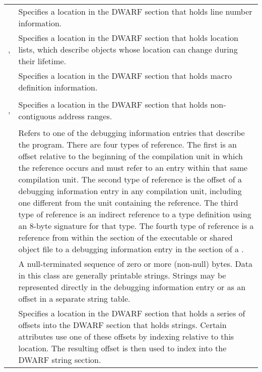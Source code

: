\begin{longtable}{l|P{11cm}}
\hypertarget{chap:classlineptr}{}
&Specifies a location in the DWARF section that holds line 
number information.
\\

\hypertarget{chap:classloclist}{}
, 
\hypertarget{chap:classloclistsptr}{}
&Specifies a location in the DWARF section that holds location 
lists, which describe objects whose location can change during 
their lifetime.
\\

\hypertarget{chap:classmacptr}{}
&Specifies 
a location in the DWARF section that holds macro definition
information.
\\

\hypertarget{chap:classrnglist}{}
, 
\hypertarget{chap:classrnglistsptr}{}
&Specifies a location in the DWARF section that holds 
non-contiguous address ranges.
\\

\hypertarget{chap:classreference}{}
&Refers to one of the debugging information
entries that \mbox{describe} the program.  There are four types of
\mbox{reference}. The first is an offset relative to the beginning
of the \mbox{compilation} unit in which the reference occurs and must
refer to an entry within that same compilation unit. The second
type of reference is the offset of a debugging \mbox{information}
entry in any compilation unit, including one different from
the unit containing the reference. The third type of reference
is an indirect reference to a 
type definition using an 8-byte signature 
for that type. The fourth type of reference is a reference from within the 
\dotdebuginfo{} section of the executable or shared object file to
a debugging information entry in the \dotdebuginfo{} section of 
a .
\\

\hypertarget{chap:classstring}{}
& A null-terminated sequence of zero or more
(non-null) bytes. Data in this class are generally
printable strings. Strings may be represented directly in
the debugging \mbox{information} entry or as an offset in a separate
string table.
\\

\hypertarget{chap:classstroffsetsptr}{}
&Specifies a location in the DWARF section that holds
a series of offsets into the DWARF section that holds strings.
Certain attributes use one of these offsets by indexing 
relative to this location. The resulting offset is then 
used to index into the DWARF string section.
\\

\hline
\end{longtable}


